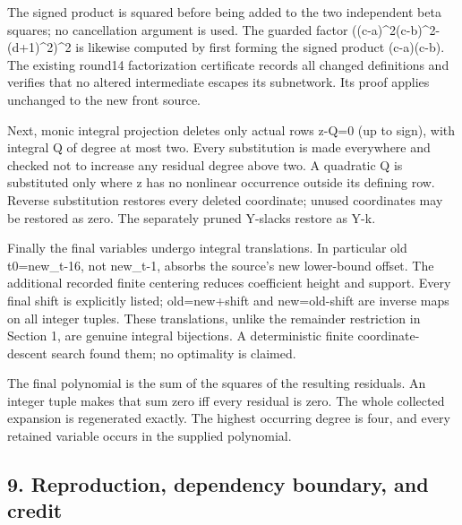 The signed product is squared before being added to the two independent beta squares; no cancellation argument is used. The guarded factor ((c-a)\textasciicircum{}\allowbreak{}2\textasteriskcentered{}\allowbreak{}(c-b)\textasciicircum{}\allowbreak{}2-(d+\allowbreak{}1)\textasciicircum{}\allowbreak{}2)\textasciicircum{}\allowbreak{}2 is likewise computed by first forming the signed product (c-a)(c-b). The existing round14 factorization certificate records all changed definitions and verifies that no altered intermediate escapes its subnetwork. Its proof applies unchanged to the new front source.



Next, monic integral projection deletes only actual rows z-Q=\allowbreak{}0 (up to sign), with integral Q of degree at most two. Every substitution is made everywhere and checked not to increase any residual degree above two. A quadratic Q is substituted only where z has no nonlinear occurrence outside its defining row. Reverse substitution restores every deleted coordinate; unused coordinates may be restored as zero. The separately pruned Y-slacks restore as Y-k.



Finally the final variables undergo integral translations. In particular old t0=\allowbreak{}new\_\allowbreak{}t-16, not new\_\allowbreak{}t-1, absorbs the source's new lower-bound offset. The additional recorded finite centering reduces coefficient height and support. Every final shift is explicitly listed; old=\allowbreak{}new+\allowbreak{}shift and new=\allowbreak{}old-shift are inverse maps on all integer tuples. These translations, unlike the remainder restriction in Section 1, are genuine integral bijections. A deterministic finite coordinate-descent search found them; no optimality is claimed.



The final polynomial is the sum of the squares of the resulting residuals. An integer tuple makes that sum zero iff every residual is zero. The whole collected expansion is regenerated exactly. The highest occurring degree is four, and every retained variable occurs in the supplied polynomial.



\subsection*{9. Reproduction, dependency boundary, and credit}



